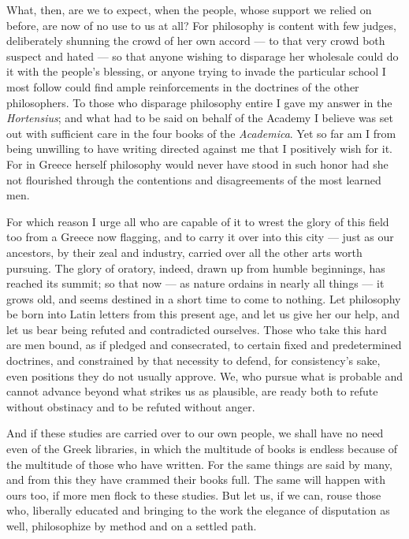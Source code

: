  What, then, are we to expect, when the people, whose support we relied on before, are now of no use to us at all? For philosophy is content with few judges, deliberately shunning the crowd of her own accord — to that very crowd both suspect and hated — so that anyone wishing to disparage her wholesale could do it with the people's blessing, or anyone trying to invade the particular school I most follow could find ample reinforcements in the doctrines of the other philosophers. To those who disparage philosophy entire I gave my answer in the \textit{Hortensius}; and what had to be said on behalf of the Academy I believe was set out with sufficient care in the four books of the \textit{Academica}. Yet so far am I from being unwilling to have writing directed against me that I positively wish for it. For in Greece herself philosophy would never have stood in such honor had she not flourished through the contentions and disagreements of the most learned men.

 For which reason I urge all who are capable of it to wrest the glory of this field too from a Greece now flagging, and to carry it over into this city — just as our ancestors, by their zeal and industry, carried over all the other arts worth pursuing. The glory of oratory, indeed, drawn up from humble beginnings, has reached its summit; so that now — as nature ordains in nearly all things — it grows old, and seems destined in a short time to come to nothing. Let philosophy be born into Latin letters from this present age, and let us give her our help, and let us bear being refuted and contradicted ourselves. Those who take this hard are men bound, as if pledged and consecrated, to certain fixed and predetermined doctrines, and constrained by that necessity to defend, for consistency's sake, even positions they do not usually approve. We, who pursue what is probable and cannot advance beyond what strikes us as plausible, are ready both to refute without obstinacy and to be refuted without anger.

 And if these studies are carried over to our own people, we shall have no need even of the Greek libraries, in which the multitude of books is endless because of the multitude of those who have written. For the same things are said by many, and from this they have crammed their books full. The same will happen with ours too, if more men flock to these studies. But let us, if we can, rouse those who, liberally educated and bringing to the work the elegance of disputation as well, philosophize by method and on a settled path.

